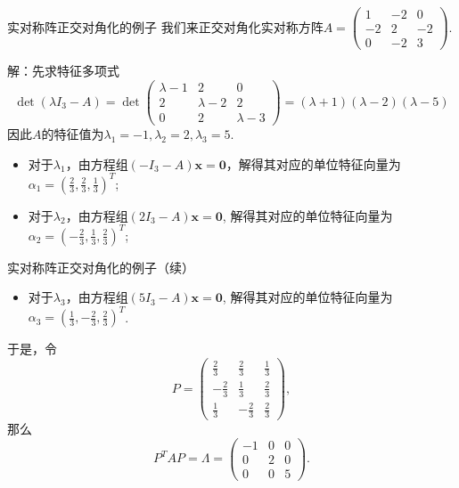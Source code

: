 \documentclass[10pt]{beamer}
\begin{document}

\begin{frame}

\begin{block}{实对称阵正交对角化的例子}
我们来正交对角化实对称方阵$A = \begin{pmatrix} 1 & -2 & 0 \\ -2 & 2 & -2 \\ 0 & -2 & 3 \end{pmatrix}.$

\vspace{1em}
\pause

解：先求特征多项式
\begin{equation*}
\det(\lambda I_3 - A) = \det \begin{pmatrix} \lambda-1 & 2 & 0 \\ 2 & \lambda-2 & 2 \\ 0 & 2 & \lambda-3\end{pmatrix} =(\lambda+1)(\lambda-2)(\lambda-5)
\end{equation*}
因此$A$的特征值为$\lambda_1=-1,\lambda_2=2,\lambda_3=5$.

\begin{itemize}
\item 对于$\lambda_1$，由方程组$(-I_3-A) \mathbf{x} = \mathbf{0}$，解得其对应的单位特征向量为$\alpha_1 = (\frac{2}{3},\frac{2}{3},\frac{1}{3})^T$;
\item 对于$\lambda_2$，由方程组$(2I_3-A) \mathbf{x} = \mathbf{0}$, 解得其对应的单位特征向量为$\alpha_2 = (-\frac{2}{3}, \frac{1}{3}, \frac{2}{3})^T$;
\end{itemize}
\end{block}

\end{frame}


\begin{frame}

\begin{block}{实对称阵正交对角化的例子（续）}
\begin{itemize}
\item 对于$\lambda_3$，由方程组$(5I_3 - A) \mathbf{x} = \mathbf{0}$, 解得其对应的单位特征向量为$\alpha_3 = (\frac{1}{3},-\frac{2}{3},\frac{2}{3})^T$.
\end{itemize}

\vspace{2em}

于是，令
$$P = \begin{pmatrix} \frac{2}{3} & \frac{2}{3} & \frac{1}{3} \\ -\frac{2}{3} & \frac{1}{3} & \frac{2}{3} \\
\frac{1}{3} & -\frac{2}{3} & \frac{2}{3} \end{pmatrix},$$
那么
$$
P^TAP = \Lambda = \begin{pmatrix} -1 & 0 & 0 \\ 0 & 2 & 0 \\ 0 & 0 & 5 \end{pmatrix}.
$$
\end{block}

\end{frame}
\end{document}
